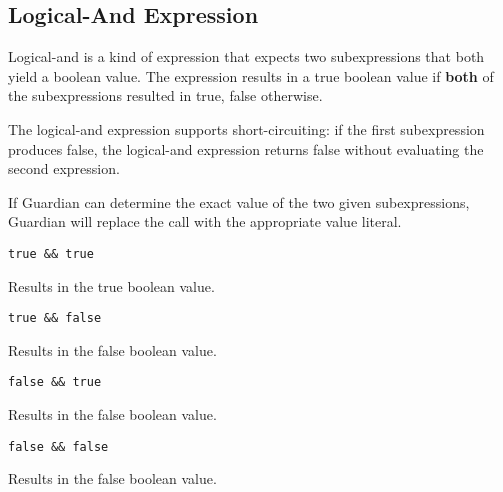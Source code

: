 
\subsection{Logical-And Expression}
{
	Logical-and is a kind of expression that expects two subexpressions that
	both yield a boolean value. The expression results in a true boolean value
	if \textbf{both} of the subexpressions resulted in true, false otherwise.
	
	The logical-and expression supports short-circuiting: if the first
	subexpression produces false, the logical-and expression returns false
	without evaluating the second expression.
	
	If Guardian can determine the exact value of the two given subexpressions,
	Guardian will replace the call with the appropriate value literal.
	
	\begin{itemize}
	{
		\item \texttt{true \&\& true}
		
			Results in the true boolean value.
			
		\item \texttt{true \&\& false}
		
			Results in the false boolean value.
			
		\item \texttt{false \&\& true}
		
			Results in the false boolean value.
			
		\item \texttt{false \&\& false}
		
			Results in the false boolean value.
	}
	\end{itemize}
}

